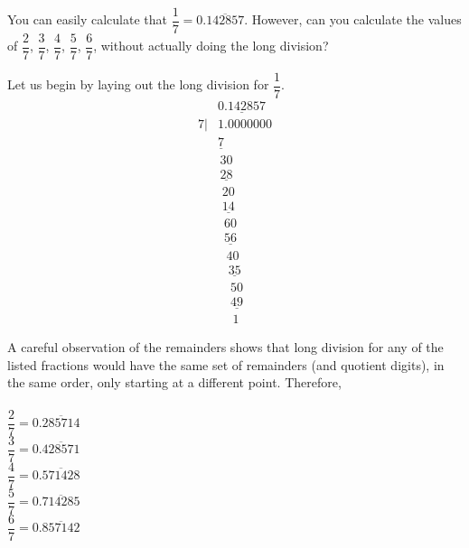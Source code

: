 

\question[3] You can easily calculate that $\dfrac{1}{7}=0.\overline{142857}$. However, can you calculate the values of $\dfrac{2}{7}$, $\dfrac{3}{7}$, $\dfrac{4}{7}$, $\dfrac{5}{7}$, $\dfrac{6}{7}$, without actually doing the long division?

\ifprintanswers
\fi 
\begin{solution}[\fullpage]
	Let us begin by laying out the long division for $\dfrac{1}{7}$.
	\begin{align}
		  & \underline{0.142857}  		\nonumber \\
		7|& 1.0000000 					\nonumber \\
		  & \underline{7}		 		\nonumber \\
		  & \,30	  					\nonumber \\	
		  & \,\underline{28}	 		\nonumber \\
		  & \,\,20						\nonumber \\
		  & \,\,\underline{14} 			\nonumber \\
		  & \,\,\,60					\nonumber \\
		  & \,\,\,\underline{56}		\nonumber \\
		  & \,\,\,\,40					\nonumber \\
		  & \,\,\,\,\,\underline{35}	\nonumber \\
		  & \,\,\,\,\,\,50				\nonumber \\
		  & \,\,\,\,\,\,\underline{49}	\nonumber \\
		  & \,\,\,\,\,\,\,1				\nonumber
	\end{align}
	
	A careful observation of the remainders shows that long division for any of the listed fractions would have the same set of remainders (and quotient digits), in the same order, only starting at a different point. Therefore,\\
	\\
	$\dfrac{2}{7} = 0.\overline{285714}$ \\
	$\dfrac{3}{7} = 0.\overline{428571}$ \\
	$\dfrac{4}{7} = 0.\overline{571428}$ \\
	$\dfrac{5}{7} = 0.\overline{714285}$ \\
	$\dfrac{6}{7} = 0.\overline{857142}$ 

\end{solution}
